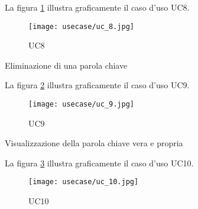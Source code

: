 \vspace{10pt}
\par\noindent
\begin{minipage}{\textwidth}
    La figura \ref{fig:uc8} illustra graficamente il caso d'uso UC8.
    \begin{figure}[H]
        \centering
        \texttt{[image: usecase/uc\_8.jpg]} 
        \caption{UC8}
        \label{fig:uc8}
    \end{figure}
\end{minipage}

\begin{usecase}{9}{Eliminazione di una parola chiave}\label{UC9}
\end{usecase}

\vspace{10pt}
\par\noindent
\begin{minipage}{\textwidth}
    La figura \ref{fig:uc9} illustra graficamente il caso d'uso UC9.
    \begin{figure}[H]
        \centering
        \texttt{[image: usecase/uc\_9.jpg]}
        \caption{UC9}
        \label{fig:uc9}
    \end{figure}
\end{minipage}

\begin{usecase}{10}{Visualizzazione della parola chiave vera e propria}\label{UC10}
\end{usecase}

\vspace{10pt}
\par\noindent
\begin{minipage}{\textwidth}
    La figura \ref{fig:uc10} illustra graficamente il caso d'uso UC10.
    \begin{figure}[H]
        \centering
        \texttt{[image: usecase/uc\_10.jpg]}
        \caption{UC10}
        \label{fig:uc10}
    \end{figure}
\end{minipage}

